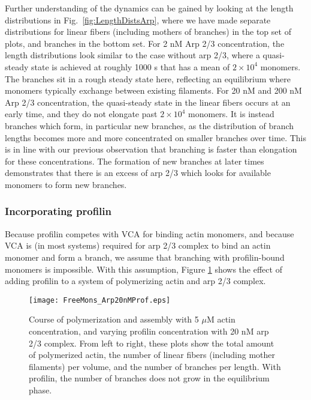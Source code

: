 \documentclass[11pt]{article}
\begin{document}
Further understanding of the dynamics can be gained by looking at the length distributions in Fig.\ \ref{fig:LengthDistsArp}, where we have made separate distributions for linear fibers (including mothers of branches) in the top set of plots, and branches in the bottom set. For 2 nM Arp 2/3 concentration, the length distributions look similar to the case without arp 2/3, where a quasi-steady state is achieved at roughly 1000 s that has a mean of $2 \times 10^4$ monomers. The branches sit in a rough steady state here, reflecting an equilibrium where monomers typically exchange between existing filaments. For 20 nM and 200 nM Arp 2/3 concentration, the quasi-steady state in the linear fibers occurs at an early time, and they do not elongate past $2 \times 10^4$ monomers. It is instead branches which form, in particular new branches, as the distribution of branch lengths becomes more and more concentrated on smaller branches over time. This is in line with our previous observation that branching is faster than elongation for these concentrations. The formation of new branches at later times demonstrates that there is an excess of arp 2/3 which looks for available monomers to form new branches. 

\subsubsection{Incorporating profilin}
Because profilin competes with VCA for binding actin monomers, and because VCA is (in most systems) required for arp 2/3 complex to bind an actin monomer and form a branch, we assume that branching with profilin-bound monomers is impossible. With this assumption, Figure \ref{fig:PolyArp2Prof} shows the effect of adding profilin to a system of polymerizing actin and arp 2/3 complex.

\begin{figure}
\centering
\texttt{[image: FreeMons\_Arp20nMProf.eps]}
\caption{\label{fig:PolyArp2Prof}Course of polymerization and assembly with 5 $\mu$M actin concentration, and varying profilin concentration with 20 nM arp 2/3 complex. From left to right, these plots show the total amount of polymerized actin, the number of linear fibers (including mother filaments) per volume, and the number of branches per length. With profilin, the number of branches does not grow in the equilibrium phase. }
\end{figure}
\end{document}
